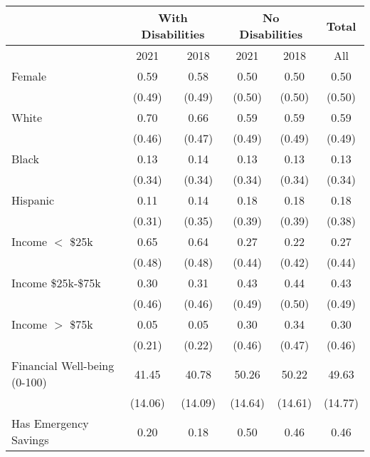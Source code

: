 {
\def\sym#1{\ifmmode^{#1}\else\(^{#1}\)\fi}
\begin{tabular}{l*{5}{c}}
\hline\hline
                    &\multicolumn{2}{c|}{With Disabilities}&\multicolumn{2}{c|}{No Disabilities}&       Total\\ \hline
                    &2021&2018&2021&2018&  All     \\
\hline
Female              &        0.59&        0.58&        0.50&        0.50&        0.50\\
                    &      (0.49)&      (0.49)&      (0.50)&      (0.50)&      (0.50)\\
White               &        0.70&        0.66&        0.59&        0.59&        0.59\\
                    &      (0.46)&      (0.47)&      (0.49)&      (0.49)&      (0.49)\\
Black               &        0.13&        0.14&        0.13&        0.13&        0.13\\
                    &      (0.34)&      (0.34)&      (0.34)&      (0.34)&      (0.34)\\
Hispanic            &        0.11&        0.14&        0.18&        0.18&        0.18\\
                    &      (0.31)&      (0.35)&      (0.39)&      (0.39)&      (0.38)\\
Income $<$ \$25k       &        0.65&        0.64&        0.27&        0.22&        0.27\\
                    &      (0.48)&      (0.48)&      (0.44)&      (0.42)&      (0.44)\\
                    Income \$25k-\$75k    &        0.30&        0.31&        0.43&        0.44&        0.43\\
                    &      (0.46)&      (0.46)&      (0.49)&      (0.50)&      (0.49)\\
                    Income $>$ \$75k       &        0.05&        0.05&        0.30&        0.34&        0.30\\
                    &      (0.21)&      (0.22)&      (0.46)&      (0.47)&      (0.46)\\
Financial Well-being (0-100)&       41.45&       40.78&       50.26&       50.22&       49.63\\
                    &     (14.06)&     (14.09)&     (14.64)&     (14.61)&     (14.77)\\
Has Emergency Savings&        0.20&        0.18&        0.50&        0.46&        0.46\\

\end{tabular}}
